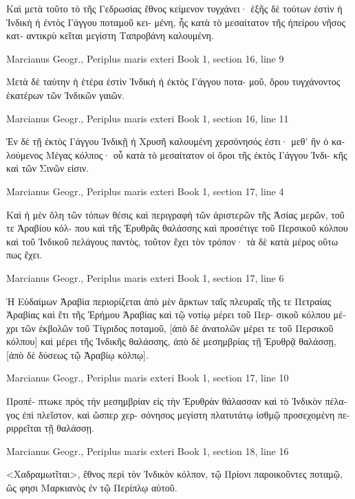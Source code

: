 \documentclass[12pt,letterpaper,twoside,final]{memoir}
\begin{document}
\begin{greek}
                                             Καὶ μετὰ 
τοῦτο τὸ τῆς Γεδρωσίας ἔθνος κείμενον τυγχάνει· ἑξῆς 
δὲ τούτων ἐστὶν ἡ Ἰνδικὴ ἡ ἐντὸς Γάγγου ποταμοῦ κει-
μένη, ἧς κατὰ τὸ μεσαίτατον τῆς ἠπείρου νῆσος κατ-
αντικρὺ κεῖται μεγίστη Ταπροβάνη καλουμένη. 



Marcianus Geogr., Periplus maris exteri 
Book 1, section 16, line 9

                                                  Μετὰ 
δὲ ταύτην ἡ ἑτέρα ἐστὶν Ἰνδικὴ ἡ ἐκτὸς Γάγγου ποτα-
μοῦ, ὅρου τυγχάνοντος ἑκατέρων τῶν Ἰνδικῶν γαιῶν. 



Marcianus Geogr., Periplus maris exteri 
Book 1, section 16, line 11

Ἐν δὲ τῇ ἐκτὸς Γάγγου Ἰνδικῇ ἡ Χρυσῆ καλουμένη 
χερσόνησός ἐστι· μεθ' ἣν ὁ καλούμενος Μέγας κόλπος· 
οὗ κατὰ τὸ μεσαίτατον οἱ ὅροι τῆς ἐκτὸς Γάγγου Ἰνδι-
κῆς καὶ τῶν Σινῶν εἰσιν. 



Marcianus Geogr., Periplus maris exteri 
Book 1, section 17, line 4

Καὶ ἡ μὲν ὅλη τῶν τόπων θέσις καὶ περιγραφὴ 
τῶν ἀριστερῶν τῆς Ἀσίας μερῶν, τοῦ τε Ἀραβίου κόλ-
που καὶ τῆς Ἐρυθρᾶς θαλάσσης καὶ προσέτιγε τοῦ 
Περσικοῦ κόλπου καὶ τοῦ Ἰνδικοῦ πελάγους παντὸς, 
τοῦτον ἔχει τὸν τρόπον· τὰ δὲ κατὰ μέρος οὕτω πως 
ἔχει. 



Marcianus Geogr., Periplus maris exteri 
Book 1, section 17, line 6

Ἡ Εὐδαίμων Ἀραβία περιορίζεται ἀπὸ μὲν 
ἄρκτων ταῖς πλευραῖς τῆς τε Πετραίας Ἀραβίας καὶ 
ἔτι τῆς Ἐρήμου Ἀραβίας καὶ τῷ νοτίῳ μέρει τοῦ Περ-
σικοῦ κόλπου μέχρι τῶν ἐκβολῶν τοῦ Τίγριδος ποταμοῦ, 
[ἀπὸ δὲ ἀνατολῶν μέρει τε τοῦ Περσικοῦ κόλπου] 
καὶ μέρει τῆς Ἰνδικῆς θαλάσσης, ἀπὸ δὲ μεσημβρίας 
τῇ Ἐρυθρᾷ θαλάσσῃ, [ἀπὸ δὲ δύσεως τῷ Ἀραβίῳ 
κόλπῳ]. 



Marcianus Geogr., Periplus maris exteri 
Book 1, section 17, line 10

                                                   Προπέ-
πτωκε πρὸς τὴν μεσημβρίαν εἰς τὴν Ἐρυθρὰν θάλασσαν 
καὶ τὸ Ἰνδικὸν πέλαγος ἐπὶ πλεῖστον, καὶ ὥσπερ χερ-
σόνησος μεγίστη πλατυτάτῳ ἰσθμῷ προσεχομένη πε-
ριρρεῖται τῇ θαλάσσῃ. 



Marcianus Geogr., Periplus maris exteri 
Book 1, section 18, line 16

<Χαδραμωτῖται>, ἔθνος περὶ τὸν Ἰνδικὸν κόλπον, 
τῷ Πρίονι παροικοῦντες ποταμῷ, ὥς φησι Μαρκιανὸς 
ἐν τῷ Περίπλῳ αὐτοῦ. 




\end{greek}
\end{document}
